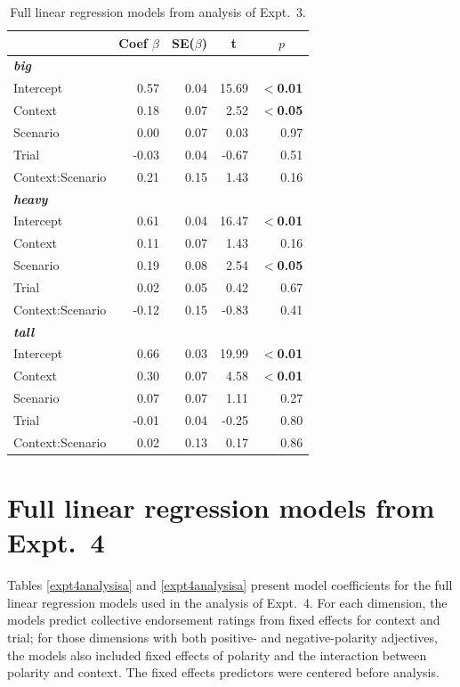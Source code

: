 \documentclass[preprint,12pt,authoryear,titlepage]{elsarticle}
\begin{document}
\begin{table}[htb] 
	\renewcommand\thetable{C.1}
	\centering \caption{Full linear regression models from analysis of Expt.~3.} \label{expt3analysis}
	\begin{tabular}{lrrrr}\toprule
		&	Coef $\beta$	&	SE($\beta$)	&	\multicolumn{1}{c}{ \textbf{t}}	&	\multicolumn{1}{c}{$p$}\\ \midrule
		\emph{\textbf{big}} \\
		Intercept 			& 	0.57 &	0.04	&	15.69	&	\textbf{$<$0.01} \\
		Context			&	0.18	&   0.07	&	2.52&	\textbf{$<$0.05} \\
		Scenario			&	0.00&   0.07	&	0.03	&	0.97 \\
		Trial				&	-0.03	&   0.04	&	-0.67	&	0.51 \\
		Context:Scenario	&	0.21	&   0.15	&	1.43	&	0.16 \\ \hline
		\emph{\textbf{heavy}}\\
		Intercept 			& 	0.61 &	0.04	&	16.47	&	\textbf{$<$0.01} \\
		Context			&	0.11	&   0.07	&	1.43	&	0.16\\
		Scenario			&	0.19&   0.08	&	2.54	&	\textbf{$<$0.05}  \\
		Trial				&	0.02	&   0.05	&	0.42&	0.67 \\
		Context:Scenario	&	-0.12	&   0.15	&	-0.83	&	0.41 \\ \hline
		\emph{\textbf{tall}}\\
		Intercept 			& 	0.66 &	0.03	&	19.99	&	\textbf{$<$0.01} \\
		Context			&	0.30	&   0.07	&	4.58&	\textbf{$<$0.01} \\
		Scenario			&	0.07&   0.07	&	1.11	&	0.27 \\
		Trial				&	-0.01	&   0.04	&	-0.25	&	0.80 \\
		Context:Scenario	&	0.02	&   0.13	&	0.17	&	0.86 \\ 
		\bottomrule
	\end{tabular}
\end{table}



\section{Full linear regression models from Expt.~4}\label{expt4results}

Tables \ref{expt4analysisa} and \ref{expt4analysisa} present model coefficients for the full linear regression models used in the analysis of Expt.~4. For each dimension, the models predict collective endorsement ratings from fixed effects for context and trial; for those dimensions with both positive- and negative-polarity adjectives, the models also included fixed effects of polarity and the interaction between polarity and context. The fixed effects predictors were centered before analysis.
\end{document}
